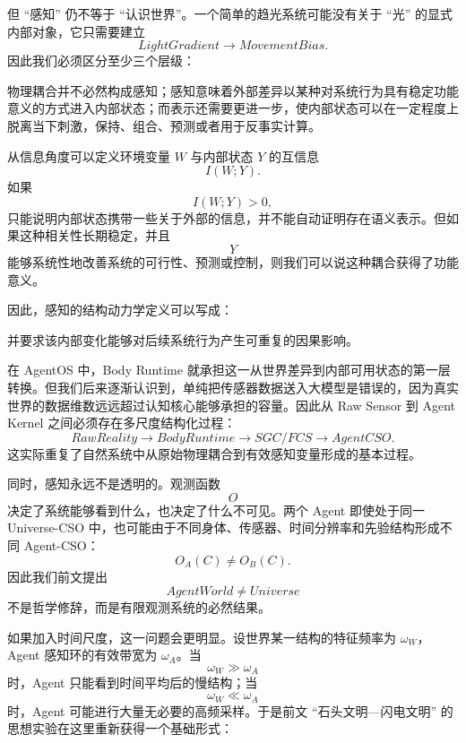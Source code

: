 但 ``感知'' 仍不等于 ``认识世界''。一个简单的趋光系统可能没有关于 ``光'' 的显式内部对象，它只需要建立
\[
LightGradient
\rightarrow
MovementBias.
\]
因此我们必须区分至少三个层级：
\begin{statementbox}
\centering
{}
\end{statementbox}
物理耦合并不必然构成感知；感知意味着外部差异以某种对系统行为具有稳定功能意义的方式进入内部状态；而表示还需要更进一步，使内部状态可以在一定程度上脱离当下刺激，保持、组合、预测或者用于反事实计算。

从信息角度可以定义环境变量 $W$ 与内部状态 $Y$ 的互信息
\[
I(W;Y).
\]
如果
\[
I(W;Y)>0,
\]
只能说明内部状态携带一些关于外部的信息，并不能自动证明存在语义表示。但如果这种相关性长期稳定，并且
\[
Y
\]
能够系统性地改善系统的可行性、预测或控制，则我们可以说这种耦合获得了功能意义。

因此，感知的结构动力学定义可以写成：
\begin{statementbox}
\centering
{}
\end{statementbox}
并要求该内部变化能够对后续系统行为产生可重复的因果影响。

在 AgentOS 中，Body Runtime 就承担这一从世界差异到内部可用状态的第一层转换。但我们后来逐渐认识到，单纯把传感器数据送入大模型是错误的，因为真实世界的数据维数远远超过认知核心能够承担的容量。因此从 Raw Sensor 到 Agent Kernel 之间必须存在多尺度结构化过程：
\[
RawReality
\rightarrow
BodyRuntime
\rightarrow
SGC/FCS
\rightarrow
AgentCSO.
\]
这实际重复了自然系统中从原始物理耦合到有效感知变量形成的基本过程。

同时，感知永远不是透明的。观测函数
\[
O
\]
决定了系统能够看到什么，也决定了什么不可见。两个 Agent 即使处于同一 Universe-CSO 中，也可能由于不同身体、传感器、时间分辨率和先验结构形成不同 Agent-CSO：
\[
O_A(C)\neq O_B(C).
\]
因此我们前文提出
\[
AgentWorld
\neq
Universe
\]
不是哲学修辞，而是有限观测系统的必然结果。

如果加入时间尺度，这一问题会更明显。设世界某一结构的特征频率为 $\omega_W$，Agent 感知环的有效带宽为 $\omega_A$。当
\[
\omega_W\gg\omega_A
\]
时，Agent 只能看到时间平均后的慢结构；当
\[
\omega_W\ll\omega_A
\]
时，Agent 可能进行大量无必要的高频采样。于是前文 ``石头文明—闪电文明'' 的思想实验在这里重新获得一个基础形式：
\begin{statementbox}
\centering
{}
\end{statementbox}

